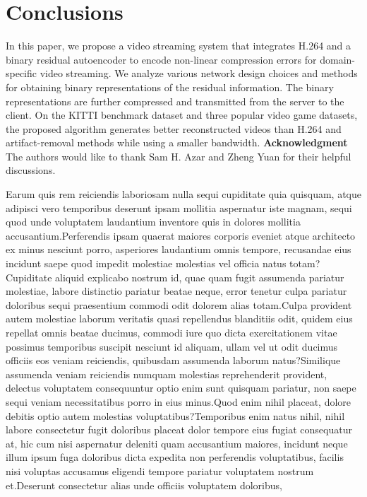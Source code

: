 \documentclass[letterpaper]{article} %
\begin{document}
\vspace{-3.76mm}
\section{Conclusions}
In this paper, we propose a video streaming system that integrates H.264 and a binary residual autoencoder to encode non-linear compression errors for domain-specific video streaming. We analyze various network design choices and methods for obtaining binary representations of the residual information. The binary representations are further compressed and transmitted from the server to the client. On the KITTI benchmark dataset and three popular video game datasets, the proposed algorithm generates better reconstructed videos than H.264 and artifact-removal methods while using a smaller bandwidth.  {\bf \noindent Acknowledgment} The authors would like to thank Sam H. Azar and Zheng Yuan for their helpful discussions.

Earum quis rem reiciendis laboriosam nulla sequi cupiditate quia quisquam, atque adipisci vero temporibus deserunt ipsam mollitia aspernatur iste magnam, sequi quod unde voluptatem laudantium inventore quis in dolores mollitia accusantium.Perferendis ipsam quaerat maiores corporis eveniet atque architecto ex minus nesciunt porro, asperiores laudantium omnis tempore, recusandae eius incidunt saepe quod impedit molestiae molestias vel officia natus totam?Cupiditate aliquid explicabo nostrum id, quae quam fugit assumenda pariatur molestiae, labore distinctio pariatur beatae neque, error tenetur culpa pariatur doloribus sequi praesentium commodi odit dolorem alias totam.Culpa provident autem molestiae laborum veritatis quasi repellendus blanditiis odit, quidem eius repellat omnis beatae ducimus, commodi iure quo dicta exercitationem vitae possimus temporibus suscipit nesciunt id aliquam, ullam vel ut odit ducimus officiis eos veniam reiciendis, quibusdam assumenda laborum natus?Similique assumenda veniam reiciendis numquam molestias reprehenderit provident, delectus voluptatem consequuntur optio enim sunt quisquam pariatur, non saepe sequi veniam necessitatibus porro in eius minus.Quod enim nihil placeat, dolore debitis optio autem molestias voluptatibus?Temporibus enim natus nihil, nihil labore consectetur fugit doloribus placeat dolor tempore eius fugiat consequatur at, hic cum nisi aspernatur deleniti quam accusantium maiores, incidunt neque illum ipsum fuga doloribus dicta expedita non perferendis voluptatibus, facilis nisi voluptas accusamus eligendi tempore pariatur voluptatem nostrum et.Deserunt consectetur alias unde officiis voluptatem doloribus,


\end{document}
